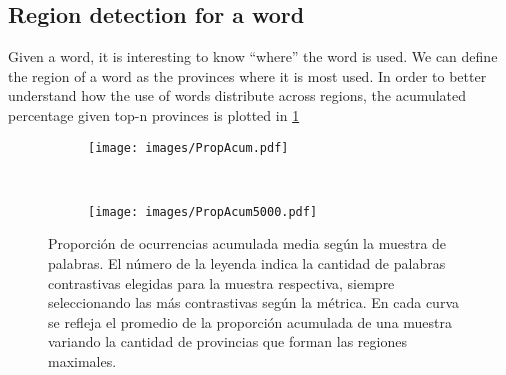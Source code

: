 \subsection*{Region detection for a word}

Given a word, it is interesting to know ``where'' the word is used. We can define the region of a word as the provinces where it is most used. In order to better understand how the use of words distribute across regions, the acumulated percentage given top-n provinces is plotted in \ref{fig:propAcum}


\begin{figure}
\centering

\begin{subfigure}[b]{\textwidth}
    \texttt{[image: images/PropAcum.pdf]}
    

\end{subfigure}
~
\begin{subfigure}[b]{0.5 \textwidth}
    \texttt{[image: images/PropAcum5000.pdf]}
\end{subfigure}

\caption{Proporción de ocurrencias acumulada media según la muestra de palabras. El número de la leyenda indica la cantidad de palabras contrastivas elegidas para la muestra respectiva, siempre seleccionando las más contrastivas según la métrica. En cada curva se refleja el promedio de la proporción acumulada de una muestra variando la cantidad de provincias que forman las regiones maximales.}
\label{fig:propAcum}

\end{figure}
